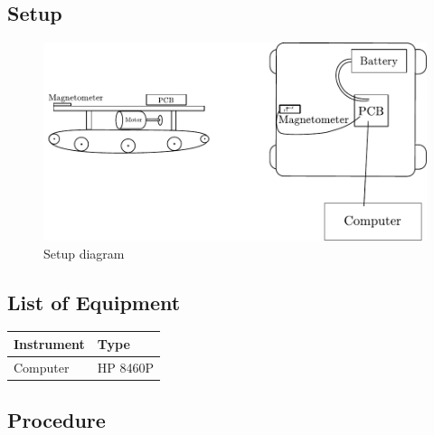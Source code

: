 \subsection{Setup}
\begin{figure}[H]
  \centering
  \includegraphics[scale=0.8]{figures/magnetoCalibSetup.pdf}
  \caption{Setup diagram}
  \label{fig:calibrationSetupDiagram}
\end{figure}\vspace{-5mm}
\subsection{List of Equipment}

\begin{table}[H]
\begin{tabular}{|p{10cm}|p{4cm}|}
\hline%
  \textbf{Instrument}                     &  \textbf{Type}       \\
\hline%
  Computer                                &  HP 8460P            \\
\hline %
\end{tabular}
\end{table}

\subsection{Procedure}


